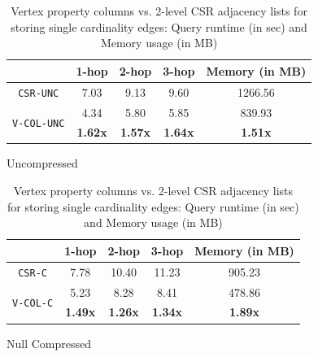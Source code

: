 \begin{table}
	\centering
	\begin{subtable}{1\textwidth}
		\centering
		\bgroup
		\setlength{\tabcolsep}{8pt}
		\def\arraystretch{1.2}%
		\begin{tabular}{ |c|c|c|c|c| }
			\hline
			& \textbf{1-hop} & \textbf{2-hop} & \textbf{3-hop} & \textbf{Memory (in MB)} \\ 
			\hline \hline
			\texttt{CSR-UNC}& 7.03 & 9.13 & 9.60 & 1266.56 \\ 
			\hline
			\multirow{2}{*}{\texttt{V-COL-UNC}}& 4.34 & 5.80 & 5.85 & 839.93 \\ 
			& \textbf{1.62x} & \textbf{1.57x} & \textbf{1.64x} & \textbf{1.51x} \\ 
			\hline
		\end{tabular}
		\egroup
		\captionsetup{justification=centering}
		\caption{Uncompressed}
		\label{tbl:s1}
	\end{subtable}
	\begin{subtable}{1\textwidth}
		\centering
		\bgroup
		\setlength{\tabcolsep}{8pt}
		\def\arraystretch{1.2}
		\begin{tabular}{ |c|c|c|c|c| } 
			\hline
			& \textbf{1-hop} & \textbf{2-hop} & \textbf{3-hop} & \textbf{Memory (in MB)} \\ 
			\hline \hline
			\texttt{CSR-C}& 7.78 & 10.40 & 11.23 & 905.23 \\ 
			\hline
			\multirow{2}{*}{\texttt{V-COL-C}}& 5.23 & 8.28 & 8.41 & 478.86 \\ 
			& \textbf{1.49x} & \textbf{1.26x} & \textbf{1.34x} & \textbf{1.89x} \\ 
			\hline
		\end{tabular}
		\egroup
		\captionsetup{justification=centering}
		\caption{Null Compressed}
		\label{tbl:s2}
	\end{subtable}
	\captionsetup{justification=centering}
	\caption{Vertex property columns vs. 2-level CSR adjacency lists for storing single cardinality edges: Query runtime (in sec) and Memory usage (in MB)  }
\end{table}

